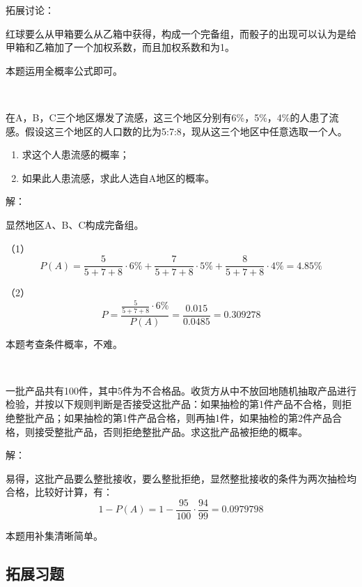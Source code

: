 拓展讨论：

红球要么从甲箱要么从乙箱中获得，构成一个完备组，而骰子的出现可以认为是给甲箱和乙箱加了一个加权系数，而且加权系数和为1。

\begin{tcolorbox}
本题运用全概率公式即可。
\end{tcolorbox}

~

\begin{example}
在A，B，C三个地区爆发了流感，这三个地区分别有6\%，5\%，4\%的人患了流感。假设这三个地区的人口数的比为5:7:8，现从这三个地区中任意选取一个人。
\begin{enumerate}
    \item 求这个人患流感的概率；
    \item 如果此人患流感，求此人选自A地区的概率。
\end{enumerate}
\end{example}

解：

显然地区A、B、C构成完备组。

（1）
\[
P\left( A \right) =\frac{5}{5+7+8}\cdot 6\%+\frac{7}{5+7+8}\cdot 5\%+\frac{8}{5+7+8}\cdot 4\%=4.85\%
\]

（2）
\[
P=\frac{\frac{5}{5+7+8}\cdot 6\%}{P\left( A \right)}=\frac{0.015}{0.0485}=0.309278
\]

\begin{tcolorbox}
本题考查条件概率，不难。
\end{tcolorbox}

~
\begin{example}
一批产品共有100件，其中5件为不合格品。收货方从中不放回地随机抽取产品进行检验，并按以下规则判断是否接受这批产品：如果抽检的第1件产品不合格，则拒绝整批产品；如果抽检的第1件产品合格，则再抽1件，如果抽检的第2件产品合格，则接受整批产品，否则拒绝整批产品。求这批产品被拒绝的概率。
\end{example}

解：

易得，这批产品要么整批接收，要么整批拒绝，显然整批接收的条件为两次抽检均合格，比较好计算，有：
\[
1-P\left( A \right) =1-\frac{95}{100}\cdot \frac{94}{99}=0.0979798
\]

\begin{tcolorbox}
本题用补集清晰简单。
\end{tcolorbox}

\subsection{拓展习题}

